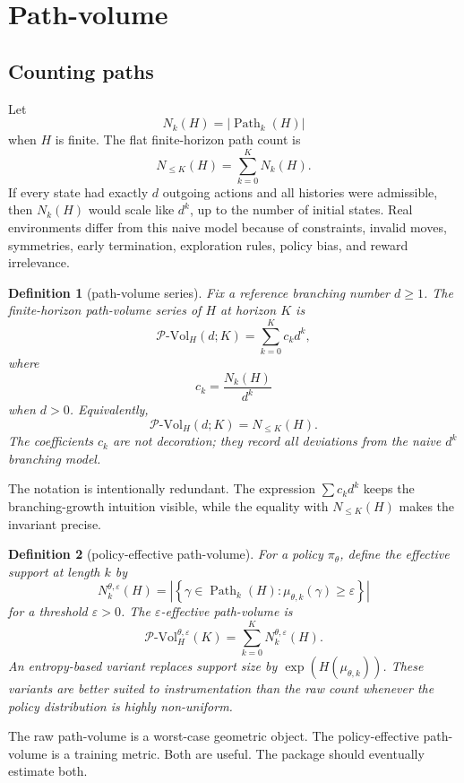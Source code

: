 \documentclass[11pt]{article}
\newtheorem{definition}{Definition}[section]
\newcommand{\Path}{\operatorname{Path}}
\newcommand{\PVol}{\mathcal{P}\text{-}\mathrm{Vol}}
\begin{document}
\section{Path-volume}

\subsection{Counting paths}

Let
\[
    N_k(H)=|\Path_k(H)|
\]
when \(H\) is finite.  The flat finite-horizon path count is
\[
    N_{\le K}(H)=\sum_{k=0}^{K}N_k(H).
\]
If every state had exactly \(d\) outgoing actions and all histories were admissible, then \(N_k(H)\) would scale like \(d^k\), up to the number of initial states.  Real environments differ from this naive model because of constraints, invalid moves, symmetries, early termination, exploration rules, policy bias, and reward irrelevance.

\begin{definition}[path-volume series]\label{def:pvol}
Fix a reference branching number \(d\ge 1\).  The finite-horizon path-volume series of \(H\) at horizon \(K\) is
\[
    \PVol_H(d;K)=\sum_{k=0}^{K}c_k d^k,
\]
where
\[
    c_k=\frac{N_k(H)}{d^k}
\]
when \(d>0\).  Equivalently,
\[
    \PVol_H(d;K)=N_{\le K}(H).
\]
The coefficients \(c_k\) are not decoration; they record all deviations from the naive \(d^k\) branching model.
\end{definition}

The notation is intentionally redundant.  The expression \(\sum c_k d^k\) keeps the branching-growth intuition visible, while the equality with \(N_{\le K}(H)\) makes the invariant precise.

\begin{definition}[policy-effective path-volume]
For a policy \(\pi_\theta\), define the effective support at length \(k\) by
\[
    N_k^{\theta,\varepsilon}(H)=\left|\left\{\gamma\in \Path_k(H):\mu_{\theta,k}(\gamma)\ge \varepsilon\right\}\right|
\]
for a threshold \(\varepsilon>0\).  The \(\varepsilon\)-effective path-volume is
\[
    \PVol_{H}^{\theta,\varepsilon}(K)=\sum_{k=0}^{K} N_k^{\theta,\varepsilon}(H).
\]
An entropy-based variant replaces support size by \(\exp(H(\mu_{\theta,k}))\).  These variants are better suited to instrumentation than the raw count whenever the policy distribution is highly non-uniform.
\end{definition}

The raw path-volume is a worst-case geometric object.  The policy-effective path-volume is a training metric.  Both are useful.  The package should eventually estimate both.
\end{document}
